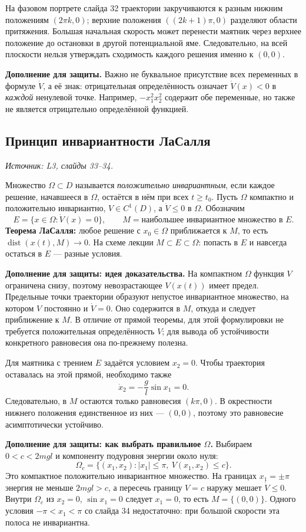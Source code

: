 На фазовом портрете слайда 32 траектории закручиваются к разным
нижним положениям $(2\pi k,0)$; верхние положения
$((2k+1)\pi,0)$ разделяют области притяжения.
Большая начальная скорость может перенести маятник через верхнее
положение до остановки в другой потенциальной яме.
Следовательно, на всей плоскости нельзя утверждать сходимость
каждого решения именно к $(0,0)$.

\textbf{Дополнение для защиты.}
Важно не буквальное присутствие всех переменных в формуле
$\dot V$, а её знак: отрицательная определённость означает
$\dot V(x)<0$ в \emph{каждой} ненулевой точке.
Например, $-x_1^2x_2^2$ содержит обе переменные, но также
не является отрицательно определённой функцией.

\subsection{Принцип инвариантности ЛаСалля}
\label{subsec:stability-lasalle}
\noindent\textit{Источник: L3, слайды 33--34.}

Множество $\Omega\subset D$ называется \emph{положительно
инвариантным}, если каждое решение, начавшееся в $\Omega$,
остаётся в нём при всех $t\ge t_0$.
Пусть $\Omega$ компактно и положительно инвариантно,
$V\in C^1(D)$, а $\dot V\le0$ в $\Omega$.
Обозначим
\[
 E=\{x\in\Omega:\dot V(x)=0\},\qquad
 M=\text{наибольшее инвариантное множество в }E.
\]
\textbf{Теорема ЛаСалля:} любое решение с $x_0\in\Omega$
приближается к $M$, то есть
$\operatorname{dist}(x(t),M)\to0$.
На схеме лекции $M\subset E\subset\Omega$:
попасть в $E$ и навсегда остаться в $E$ --- разные условия.

\textbf{Дополнение для защиты: идея доказательства.}
На компактном $\Omega$ функция $V$ ограничена снизу,
поэтому невозрастающее $V(x(t))$ имеет предел.
Предельные точки траектории образуют непустое инвариантное
множество, на котором $V$ постоянно и $\dot V=0$.
Оно содержится в $M$, откуда и следует приближение к $M$.
В отличие от прямой теоремы, для этой формулировки не требуется
положительная определённость $V$; для вывода об устойчивости
конкретного равновесия она по-прежнему полезна.

Для маятника с трением $E$ задаётся условием $x_2=0$.
Чтобы траектория оставалась на этой прямой, необходимо также
\[
 \dot x_2=-\frac{g}{l}\sin x_1=0.
\]
Следовательно, в $M$ остаются только равновесия $(k\pi,0)$.
В окрестности нижнего положения единственное из них --- $(0,0)$,
поэтому это равновесие асимптотически устойчиво.

\textbf{Дополнение для защиты: как выбрать правильное $\Omega$.}
Выбираем $0<c<2mgl$ и компоненту подуровня энергии около нуля:
\[
 \Omega_c=\{(x_1,x_2): |x_1|\le\pi,\ V(x_1,x_2)\le c\}.
\]
Это компактное положительно инвариантное множество.
На границах $x_1=\pm\pi$ энергия не меньше $2mgl>c$,
а пересечь границу $V=c$ наружу мешает $\dot V\le0$.
Внутри $\Omega_c$ из $x_2=0$, $\sin x_1=0$ следует $x_1=0$,
то есть $M=\{(0,0)\}$.
Одного условия $-\pi<x_1<\pi$ со слайда 34 недостаточно:
при большой скорости эта полоса не инвариантна.


